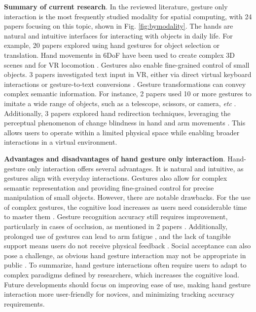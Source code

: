\documentclass[review]{fcs}
\newcommand{\revise}[2]{\textcolor[rgb]{0,0,0}{#2}}
\begin{document}
\textbf{Summary of current research}. In the reviewed literature, gesture only interaction is the most frequently studied modality for spatial computing, \revise{with 24 papers focused on this topic (see Fig. \ref{fig:bymodality})}{with 24 papers focusing on this topic, shown in Fig. \ref{fig:bymodality}}. 
\revise{Hands are a natural and intuitive interface for interacting with objects in daily life.}{The hands are natural and intuitive interfaces for interacting with objects in daily life.} For example, 20 papers explored using hand gestures for object selection or translation. Hand movements in 6DoF have been used to create complex 3D scenes \cite{DBLP:journals/tvcg/XuZSFY23, 10.1145/3491102.3517682} and for VR locomotion \cite{DBLP:conf/vr/SinJLLLN24, DBLP:conf/vr/SindhupathirajaUDH24}. Gestures also enable fine-grained control of small objects. 3 papers investigated text input in VR, either via direct virtual keyboard interactions \cite{DBLP:conf/vr/RuppGBK24, DBLP:journals/tvcg/ShenDK23} or gesture-to-text conversions \cite{DBLP:conf/ismar/SongDK22}.
Gesture transformations can convey complex semantic information. For instance, 2 papers used 10 or more gestures to imitate a wide range of objects, such as a telescope, scissors, or camera, \textit{etc} \cite{DBLP:conf/chi/PeiCLZ22, DBLP:journals/tvcg/SongDK23}. Additionally, 3 papers explored hand redirection techniques, leveraging the perceptual phenomenon of change blindness in hand and arm movements \cite{DBLP:conf/vr/MatthewsTIS22, DBLP:conf/chi/ZennerKFAK24, DBLP:conf/ismar/BanMNK22}. This allows users to operate within a limited physical space while enabling broader interactions in a virtual environment.

\textbf{Advantages and disadvantages of hand gesture only interaction}. Hand-gesture only interaction offers several advantages. It is natural and intuitive, as gestures align with everyday interactions. Gestures also allow for complex semantic representation and providing fine-grained control for precise manipulation of small objects. However, there are notable drawbacks. 
For the use of complex gestures, the cognitive load increases as users need considerable time to master them \cite{DBLP:conf/chi/PeiCLZ22}. 
Gesture recognition accuracy still requires improvement, particularly in cases of occlusion, as mentioned in 2 papers \cite{DBLP:conf/chi/PeiCLZ22, DBLP:journals/tvcg/SongDK23}. Additionally, prolonged use of gestures can lead to arm fatigue \cite{DBLP:conf/vr/SindhupathirajaUDH24, DBLP:conf/vr/QuereMJWW24}, and the lack of tangible support means users do not receive physical feedback \cite{DBLP:conf/chi/SchmitzGS022, DBLP:journals/tvcg/ShenDK23}. 
Social acceptance can also pose a challenge, as obvious hand gesture interaction may not be appropriate in public \cite{DBLP:conf/ismar/LiLMHLS22}. 
To summarize, hand gesture interactions often require users to adapt to complex paradigms defined by researchers, which increases the cognitive load. Future developments should focus on improving ease of use, making hand gesture interaction more user-friendly for novices, and minimizing tracking accuracy requirements.
\end{document}
